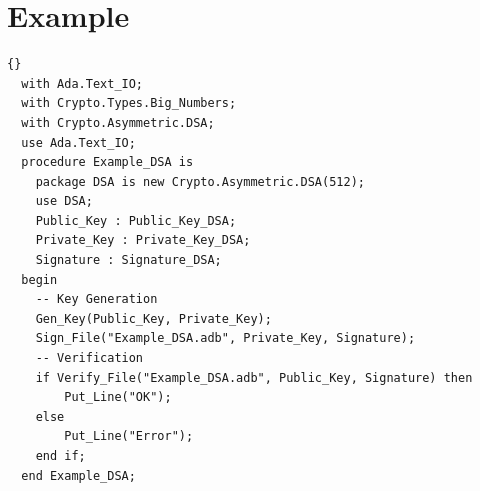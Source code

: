 \section{Example}
\begin{lstlisting}{}
  with Ada.Text_IO;
  with Crypto.Types.Big_Numbers;
  with Crypto.Asymmetric.DSA;
  use Ada.Text_IO;
  procedure Example_DSA is
    package DSA is new Crypto.Asymmetric.DSA(512);
    use DSA;
    Public_Key : Public_Key_DSA;
    Private_Key : Private_Key_DSA;
    Signature : Signature_DSA;
  begin
    -- Key Generation
    Gen_Key(Public_Key, Private_Key);
    Sign_File("Example_DSA.adb", Private_Key, Signature);
    -- Verification
    if Verify_File("Example_DSA.adb", Public_Key, Signature) then
        Put_Line("OK");
    else
        Put_Line("Error");
    end if;
  end Example_DSA;
\end{lstlisting}
